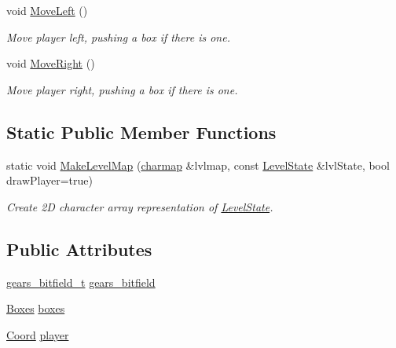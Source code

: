 \begin{DoxyCompactItemize}
void \hyperlink{classboxedin_1_1LevelState_a79afab587c3d0c9dc22315043a4be2c2}{Move\+Left} ()
\begin{DoxyCompactList}\small\item\em Move player left, pushing a box if there is one. \end{DoxyCompactList}\item 
void \hyperlink{classboxedin_1_1LevelState_ad6f4593805277f983d7f4ee5a618df58}{Move\+Right} ()
\begin{DoxyCompactList}\small\item\em Move player right, pushing a box if there is one. \end{DoxyCompactList}\end{DoxyCompactItemize}
\subsection*{Static Public Member Functions}
\begin{DoxyCompactItemize}
\item 
static void \hyperlink{classboxedin_1_1LevelState_a0cd6cb30769f24259b3128593162ab53}{Make\+Level\+Map} (\hyperlink{namespaceboxedin_a95e88d677e0a17d3f9e4a9b0de980c4f}{charmap} \&lvlmap, const \hyperlink{classboxedin_1_1LevelState}{Level\+State} \&lvl\+State, bool draw\+Player=true)
\begin{DoxyCompactList}\small\item\em Create 2\+D character array representation of \hyperlink{classboxedin_1_1LevelState}{Level\+State}. \end{DoxyCompactList}\end{DoxyCompactItemize}
\subsection*{Public Attributes}
\begin{DoxyCompactItemize}
\item 
\hyperlink{namespaceboxedin_a06d85d1dad095f12bcc1a03894abb650}{gears\+\_\+bitfield\+\_\+t} \hyperlink{classboxedin_1_1LevelState_afac5079af12178ae9c5aec7a753e21ad}{gears\+\_\+bitfield}
\item 
\hyperlink{namespaceboxedin_a9cf4c1fe66d111542a6b853f276b5d63}{Boxes} \hyperlink{classboxedin_1_1LevelState_a49db037f37aefc1ee2e41ff36735cfdf}{boxes}
\item 
\hyperlink{namespaceboxedin_afc0dedc740afcefb60a4dac20d984b16}{Coord} \hyperlink{classboxedin_1_1LevelState_a1e04f0ad962384393c45d47242260fe6}{player}
\end{DoxyCompactItemize}
